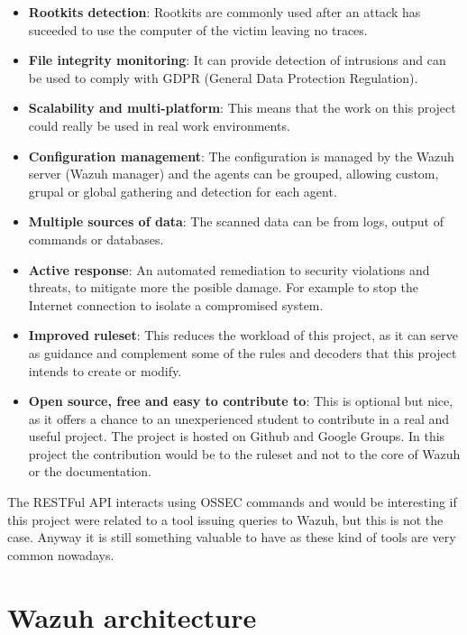 \begin{itemize}
	\item \textbf{Rootkits detection}: Rootkits are commonly used after an attack has suceeded to use the computer of the victim leaving no traces.
	\item \textbf{File integrity monitoring}: It can provide detection of intrusions and can be used to comply with GDPR (General Data Protection Regulation).
	\item \textbf{Scalability and multi-platform}: This means that the work on this project could really be used in real work environments.
	\item \textbf{Configuration management}: The configuration is managed by the Wazuh server (Wazuh manager) and the agents can be grouped, allowing custom, grupal or global gathering and detection for each agent.
	\item \textbf{Multiple sources of data}: The scanned data can be from logs, output of commands or databases. %
	\item \textbf{Active response}: An automated remediation to security violations and threats, to mitigate more the posible damage. For example to stop the Internet connection to isolate a compromised system.
	\item \textbf{Improved ruleset}: This reduces the workload of this project, as it can serve as guidance and complement some of the rules and decoders that this project intends to create or modify.
	\item \textbf{Open source, free and easy to contribute to}: This is optional but nice, as it offers a chance to an unexperienced student to contribute in a real and useful project. The project is hosted on Github and Google Groups. In this project the contribution would be to the ruleset\cite{wazuh_ruleset} and not to the core of Wazuh\cite{wazuh} or the documentation\cite{wazuh_documentation2}.
\end{itemize}
\linej
The RESTFul API interacts using OSSEC commands and would be interesting if this project were related to a tool issuing queries to Wazuh, but this is not the case. Anyway it is still something valuable to have as these kind of tools are very common nowadays.


\section{Wazuh architecture}

